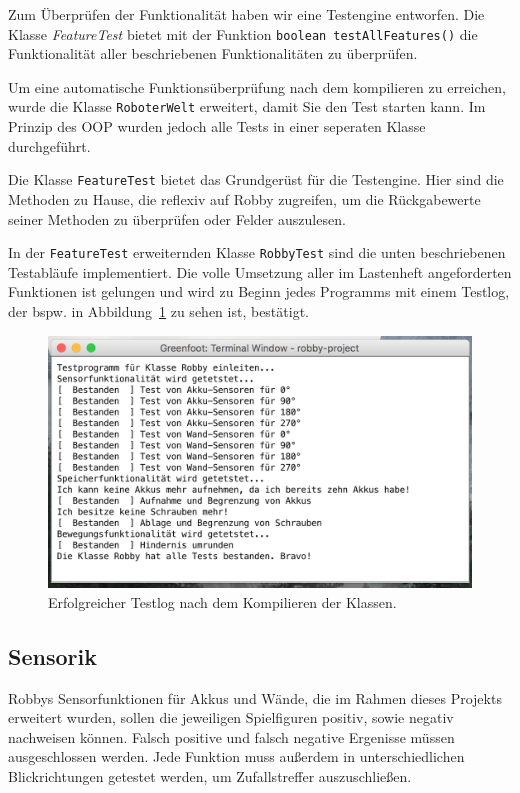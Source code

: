Zum Überprüfen der Funktionalität haben wir eine Testengine entworfen. Die Klasse \emph{FeatureTest} bietet mit der Funktion \texttt{boolean testAllFeatures()} die Funktionalität aller beschriebenen Funktionalitäten zu überprüfen.

Um eine automatische Funktionsüberprüfung nach dem kompilieren zu erreichen, wurde die Klasse \texttt{RoboterWelt} erweitert, damit Sie den Test starten kann. Im Prinzip des OOP wurden jedoch alle Tests in einer seperaten Klasse durchgeführt.

Die Klasse \texttt{FeatureTest} bietet das Grundgerüst für die Testengine. Hier sind die Methoden zu Hause, die reflexiv auf Robby zugreifen, um die Rückgabewerte seiner Methoden zu überprüfen oder Felder auszulesen.

In der \texttt{FeatureTest} erweiternden Klasse \texttt{RobbyTest} sind die unten beschriebenen Testabläufe implementiert. Die volle Umsetzung aller im Lastenheft angeforderten Funktionen ist gelungen und wird zu Beginn jedes Programms mit einem Testlog, der bspw. in Abbildung~\ref{img:testlog} zu sehen ist, bestätigt.

\begin{figure}
\centering
\includegraphics[width=\linewidth]{img/testlog}
\caption{Erfolgreicher Testlog nach dem Kompilieren der Klassen. }
\label{img:testlog}
\end{figure}

\subsection{Sensorik}
Robbys Sensorfunktionen für Akkus und Wände, die im Rahmen dieses Projekts erweitert wurden, sollen die jeweiligen Spielfiguren positiv, sowie negativ nachweisen können. Falsch positive und falsch negative Ergenisse müssen ausgeschlossen werden. Jede Funktion muss außerdem in unterschiedlichen Blickrichtungen getestet werden, um Zufallstreffer auszuschließen.

